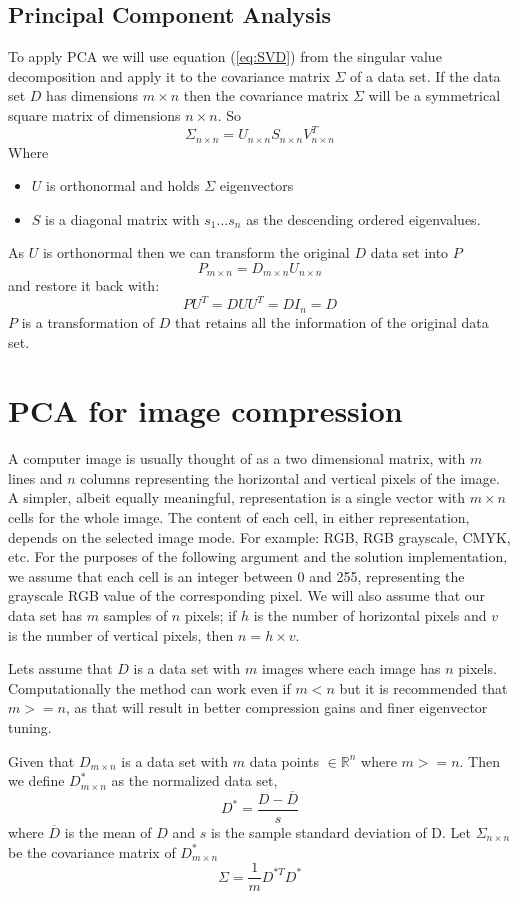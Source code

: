 \documentclass{article} %
\begin{document}
\subsection{Principal Component Analysis}
To apply PCA we will use equation (\ref{eq:SVD}) from the singular value decomposition and apply it to the covariance matrix $\Sigma$ of a data set. If the data set $D$ has dimensions ${m\times n}$ then the covariance matrix $\Sigma$ will be a symmetrical square matrix of dimensions $n\times n$. So
\begin{equation}\label{eq:SigmaLongSVD}
\Sigma_{n\times n} = U_{n\times n}S_{n\times n}V_{n\times n}^T
\end{equation}
Where
\begin{itemize}
\item $U$ is orthonormal and holds $\Sigma$ eigenvectors
\item $S$ is a diagonal matrix with $s_1 ... s_n$ as the descending ordered eigenvalues.
\end{itemize}
As $U$ is orthonormal then we can transform the original $D$ data set into $P$
\[ P_{m\times n} = D_{m\times n}U_{n\times n} \] and restore it back with:
\[P U^T = DUU^T = DI_{n} = D\]
$P$ is a transformation of $D$ that retains all the information of the original data set.

\section{PCA for image compression}
A computer image is usually thought of as a two dimensional matrix, with $m$ lines and $n$ columns representing the horizontal and vertical pixels of the image. A simpler, albeit equally meaningful, representation is a single vector with $m\times n$ cells for the whole image. The content of each cell, in either representation, depends on the selected image mode. For example: RGB, RGB grayscale, CMYK, etc. For the purposes of the following argument and the solution implementation, we assume that each cell is an integer between 0 and 255, representing the grayscale RGB value of the corresponding pixel. We will also assume that our data set has $m$ samples of $n$ pixels; if $h$ is the number of horizontal pixels and $v$ is the number of vertical pixels, then $n=h\times v$.\par
Lets assume that $D$ is a data set with $m$ images where each image has $n$ pixels. Computationally the method can work even if $m<n$ but it is recommended that $m >= n$, as that will result in better compression gains and finer eigenvector tuning.\par
Given that $D_{m\times n}$ is a data set with $m$ data points $\in \mathbb{R}^n$ where $m >= n$. Then we define ${D}_{m\times n}^*$ as the normalized data set, \[D^* = \frac{D-\overline{D}}{s}\] 
where $\overline{D}$ is the mean of $D$ and $s$ is the sample standard deviation of D. Let $\Sigma_{n\times n}$ be the covariance matrix of $D^{*}_{m\times n}$
\begin{equation}\label{eq:sigma}
 \Sigma = \frac{1}{m}D^{*T}D^*
\end{equation}
\end{document}
